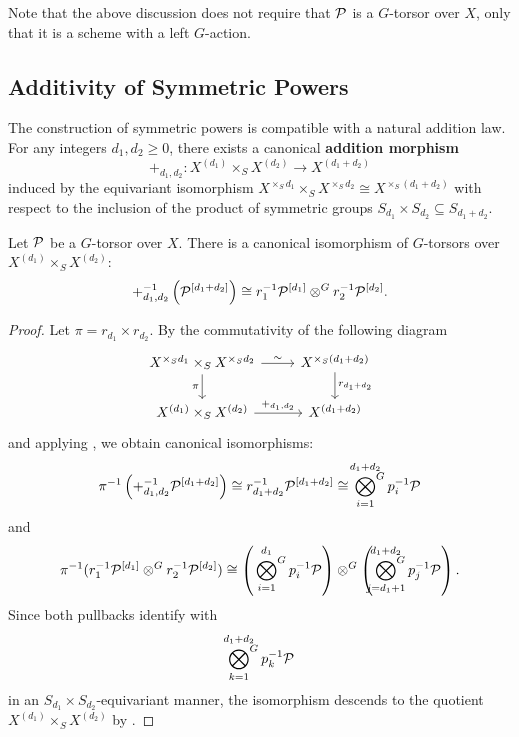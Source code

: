 \begin{rem*}
    Note that the above discussion does not require that $\mathcal{P}$ is a $G$-torsor over $X$, only that it is a scheme
    with a left $G$-action.
\end{rem*}




%
%
\subsection*{Additivity of Symmetric Powers}
The construction of symmetric powers is compatible with a natural addition law.
For any integers $d_1, d_2 \geq 0$, there exists a canonical \textbf{addition morphism}
\[ +_{d_1, d_2}: X^{(d_1)} \times_S X^{(d_2)} \to X^{(d_1+d_2)} \]
induced by the equivariant isomorphism $X^{\times_S d_1} \times_S X^{\times_S d_2} \cong X^{\times_S (d_1+d_2)}$ with respect to the inclusion of the product of symmetric groups $S_{d_1} \times S_{d_2} \subseteq S_{d_1+d_2}$.

\begin{prop}\label{prop:symmetric_powers_on_curves}
    Let $\mathcal{P}$ be a $G$-torsor over $X$. There is a canonical isomorphism of $G$-torsors over $X^{(d_1)} \times_S X^{(d_2)}$:
    \[
    +_{d_1, d_2}^{-1} \left( \mathcal{P}^{[d_1+d_2]} \right) \cong r_1^{-1} \mathcal{P}^{[d_1]} \otimes^G r_2^{-1} \mathcal{P}^{[d_2]}.
    \]
\end{prop}
\begin{proof}
Let $\pi = r_{d_1} \times r_{d_2}$. By the commutativity of the following diagram
\[
\begin{tikzcd}
X^{\times_S d_1} \times_S X^{\times_S d_2} \arrow[r, "\sim"] \arrow[d, "\pi"'] & X^{\times_S (d_1+d_2)} \arrow[d, "r_{d_1+d_2}"] \\
X^{(d_1)} \times_S X^{(d_2)} \arrow[r, "+_{d_1, d_2}"] & X^{(d_1+d_2)}
\end{tikzcd}
\]
and applying , we obtain canonical isomorphisms:
\[
\pi^{-1} \left( +_{d_1, d_2}^{-1} \mathcal{P}^{[d_1+d_2]} \right) \cong r_{d_1+d_2}^{-1} \mathcal{P}^{[d_1+d_2]} \cong \sideset{}{^G}\bigotimes_{i=1}^{d_1+d_2} p_i^{-1} \mathcal{P}
\]
and
\[
\pi^{-1} (r_1^{-1} \mathcal{P}^{[d_1]} \otimes^G r_2^{-1} \mathcal{P}^{[d_2]}) \cong \left( \sideset{}{^G}\bigotimes_{i=1}^{d_1} p_i^{-1} \mathcal{P} \right) \otimes^G \left( \sideset{}{^G}\bigotimes_{j=d_1+1}^{d_1+d_2} p_j^{-1} \mathcal{P} \right).
\]
Since both pullbacks identify with
\[
\sideset{}{^G}\bigotimes_{k=1}^{d_1+d_2} p_k^{-1} \mathcal{P}
\]
in an $S_{d_1} \times S_{d_2}$-equivariant manner, the isomorphism descends to the quotient $X^{(d_1)} \times_S X^{(d_2)}$ by .
\end{proof}

